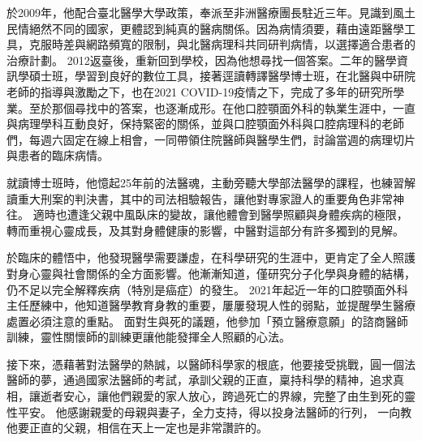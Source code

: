 \documentclass{letter}
\begin{document}
\begin{letter}
於2009年，他配合臺北醫學大學政策，奉派至非洲醫療團長駐近三年。見識到風土民情絕然不同的國家，更體認到純真的醫病關係。因為病情須要，藉由遠距醫學工具，克服時差與網路頻寬的限制，與北醫病理科共同研判病情，以選擇適合患者的治療計劃。
2012返臺後，重新回到學校，因為他想尋找一個答案。二年的醫學資訊學碩士班，學習到良好的數位工具，接著逕讀轉譯醫學博士班，在北醫與中研院老師的指導與激勵之下，也在2021 COVID-19疫情之下，完成了多年的研究所學業。至於那個尋找中的答案，也逐漸成形。在他口腔顎面外科的執業生涯中，一直與病理學科互動良好，保持緊密的關係，並與口腔顎面外科與口腔病理科的老師們，每週六固定在線上相會，一同帶領住院醫師與醫學生們，討論當週的病理切片與患者的臨床病情。


就讀博士班時，他憶起25年前的法醫魂，主動旁聽大學部法醫學的課程，也練習解讀重大刑案的判決書，其中的司法相驗報告，讓他對專家證人的重要角色非常神往。
適時也遭逢父親中風臥床的變故，讓他體會到醫學照顧與身體疾病的極限，轉而重視心靈成長，及其對身體健康的影響，中醫對這部分有許多獨到的見解。

於臨床的體悟中，他發現醫學需要謙虛，在科學研究的生涯中，更肯定了全人照護對身心靈與社會關係的全方面影響。他漸漸知道，僅研究分子化學與身體的結構，仍不足以完全解釋疾病（特別是癌症）的發生。
2021年起近一年的口腔顎面外科主任歷練中，他知道醫學教育身教的重要，屢屢發現人性的弱點，並提醒學生醫療處置必須注意的重點。 %
面對生與死的議題，他參加「預立醫療意願」的諮商醫師訓練，靈性關懷師的訓練更讓他能發揮全人照顧的心法。

接下來，憑藉著對法醫學的熱誠，以醫師科學家的根底，他要接受挑戰，圓一個法醫師的夢，通過國家法醫師的考試，承訓父親的正直，稟持科學的精神，追求真相，讓逝者安心，讓他們親愛的家人放心，跨過死亡的界線，完整了由生到死的靈性平安。
他感謝親愛的母親與妻子，全力支持，得以投身法醫師的行列，%
一向教他要正直的父親，相信在天上一定也是非常讚許的。


\end{letter}
\end{document}
